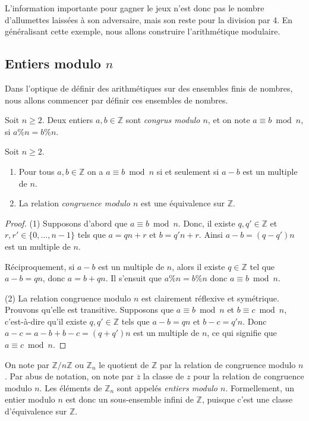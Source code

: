 \documentclass[french,course,oneside,theoremnosection]{lecture}
\newcommand{\Z}{\mathbb{Z}}
\begin{document}
L'information importante pour gagner le jeux n'est donc pas le nombre d'allumettes laissées à son adversaire, mais son reste pour la division par 4. En généralisant cette exemple, nous allons construire l'arithmétique modulaire.

\subsection{Entiers modulo $n$}


Dans l'optique de définir des arithmétiques sur des ensembles finis de nombres, nous allons commencer par définir ces ensembles de nombres.

\begin{definition}
Soit $n\geq 2$. Deux entiers $a,b\in \Z$ sont \emph{congrus modulo $n$}, et on note $a \equiv b \bmod n$, si $a\%n=b\%n$.
\end{definition}

\begin{lemma} Soit $n \geq 2$.
\begin{enumerate}[(1)]
\item Pour tous $a,b \in \Z$ on a $a \equiv b \bmod n$ si et seulement si $a-b$ est un multiple de $n$.
\item La relation \emph{congruence modulo $n$} est une équivalence sur $\Z$.
\end{enumerate}
\end{lemma}
\begin{proof}
(1) Supposons d'abord que $a \equiv b \bmod n$. Donc, il existe $q, q' \in \Z$ et  $r,r'\in \{0, \ldots, n-1\}$ tels que $a=qn+r$ et $b=q'n+r$. Ainsi $a-b=(q-q')n$ est un multiple de $n$.

Réciproquement, si $a-b$ est un multiple de $n$, alors il existe $q\in \Z$ tel que $a-b=qn$, donc $a=b+qn$. Il s'ensuit que $a\%n=b\%n$ donc $a \equiv b \bmod n$.

(2) La relation congruence modulo $n$ est clairement réflexive et symétrique. Prouvons qu'elle est transitive. Supposons que $a \equiv b \bmod n$ et $b \equiv c \bmod n$, c'est-à-dire qu'il existe $q,q'\in \Z$ tels que $a-b=qn$ et $b-c=q'n$. Donc $a-c=a-b+b-c=(q+q')n$ est un multiple de $n$, ce qui signifie que $a \equiv c \bmod n$. 
\end{proof}

\begin{notation}
On note par $\Z/n\Z$ ou $\Z_n$ le quotient de $\Z$ par la relation de congruence modulo $n$. Par abus de notation, on note par $\overline{z}$ la classe de $z$ pour la relation de congruence modulo $n$. Les éléments de $\Z_n$ sont appelés \emph{entiers modulo $n$}. Formellement, un entier modulo $n$ est donc un sous-ensemble infini de $\Z$, puisque c'est une classe d'équivalence sur $\Z$.
\end{notation}
\end{document}
